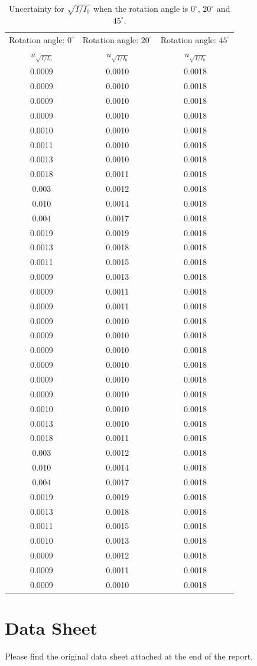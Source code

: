 \documentclass{article}
\begin{document}
\begin{table}[H]\centering
\begin{tabular}{ccc}
\toprule
Rotation angle: $0^\circ$ & Rotation angle: $20^\circ$ & Rotation angle: $45^\circ$\\
$u_{\sqrt{I/I_{0}}}$ & $u_{\sqrt{I/I_{0}}}$ & $u_{\sqrt{I/I_{0}}}$\\
\midrule
    0.0009  & 0.0010 & 0.0018 \\
    0.0009  & 0.0010 & 0.0018 \\
    0.0009  & 0.0010 & 0.0018 \\
    0.0009  & 0.0010 & 0.0018 \\
    0.0010  & 0.0010 & 0.0018 \\
    0.0011  & 0.0010 & 0.0018 \\
    0.0013  & 0.0010 & 0.0018 \\
    0.0018  & 0.0011 & 0.0018 \\
    0.003   & 0.0012 & 0.0018 \\
    0.010   & 0.0014 & 0.0018 \\
    0.004   & 0.0017 & 0.0018 \\
    0.0019  & 0.0019 & 0.0018 \\
    0.0013  & 0.0018 & 0.0018 \\
    0.0011  & 0.0015 & 0.0018 \\
    0.0009  & 0.0013 & 0.0018 \\
    0.0009  & 0.0011 & 0.0018 \\
    0.0009  & 0.0011 & 0.0018 \\
    0.0009  & 0.0010 & 0.0018 \\
    0.0009  & 0.0010 & 0.0018 \\
    0.0009  & 0.0010 & 0.0018 \\
    0.0009  & 0.0010 & 0.0018 \\
    0.0009  & 0.0010 & 0.0018 \\
    0.0009  & 0.0010 & 0.0018 \\
    0.0010  & 0.0010 & 0.0018 \\
    0.0013  & 0.0010 & 0.0018 \\
    0.0018  & 0.0011 & 0.0018 \\
    0.003   & 0.0012 & 0.0018 \\
    0.010   & 0.0014 & 0.0018 \\
    0.004   & 0.0017 & 0.0018 \\
    0.0019  & 0.0019 & 0.0018 \\
    0.0013  & 0.0018 & 0.0018 \\
    0.0011  & 0.0015 & 0.0018 \\
    0.0010  & 0.0013 & 0.0018 \\
    0.0009  & 0.0012 & 0.0018 \\
    0.0009  & 0.0011 & 0.0018 \\
    0.0009  & 0.0010 & 0.0018 \\
\bottomrule
\end{tabular}
\caption{Uncertainty for $\sqrt{I/I_0}$ when the rotation angle is $0^\circ$, $20^\circ$ and $45^\circ$.}\label{TableUnc1/4}
\end{table}

\section{Data Sheet}

Please find the original data sheet attached at the end of the report.


\end{document}
